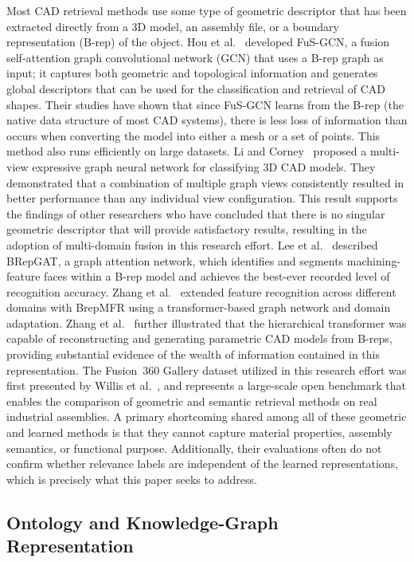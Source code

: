 \documentclass[preprint,12pt]{elsarticle}
\begin{document}
Most CAD retrieval methods use some type of geometric descriptor that has been extracted directly from a 3D model, an assembly file, or a boundary representation (B-rep) of the object.
Hou et al.~\cite{Hou2023} developed FuS-GCN, a fusion self-attention graph convolutional network (GCN) that uses a B-rep graph as input; it captures both geometric and topological information and generates global descriptors that can be used for the classification and retrieval of CAD shapes.
Their studies have shown that since FuS-GCN learns from the B-rep (the native data structure of most CAD systems), there is less loss of information than occurs when converting the model into either a mesh or a set of points.
This method also runs efficiently on large datasets.
Li and Corney~\cite{LiCorney2023} proposed a multi-view expressive graph neural network for classifying 3D CAD models.
They demonstrated that a combination of multiple graph views consistently resulted in better performance than any individual view configuration.
This result supports the findings of other researchers who have concluded that there is no singular geometric descriptor that will provide satisfactory results, resulting in the adoption of multi-domain fusion in this research effort.
Lee et al.~\cite{Lee2023} described BRepGAT, a graph attention network, which identifies and segments machining-feature faces within a B-rep model and achieves the best-ever recorded level of recognition accuracy.
Zhang et al.~\cite{Zhang2024} extended feature recognition across different domains with BrepMFR using a transformer-based graph network and domain adaptation.
Zhang et al.~\cite{ZhangBrep2Seq2024} further illustrated that the hierarchical transformer was capable of reconstructing and generating parametric CAD models from B-reps, providing substantial evidence of the wealth of information contained in this representation.
The Fusion~360 Gallery dataset utilized in this research effort was first presented by Willis et al.~\cite{Willis2021}, and represents a large-scale open benchmark that enables the comparison of geometric and semantic retrieval methods on real industrial assemblies.
A primary shortcoming shared among all of these geometric and learned methods is that they cannot capture material properties, assembly semantics, or functional purpose.
Additionally, their evaluations often do not confirm whether relevance labels are independent of the learned representations, which is precisely what this paper seeks to address.

\subsection{Ontology and Knowledge-Graph Representation}
\end{document}
